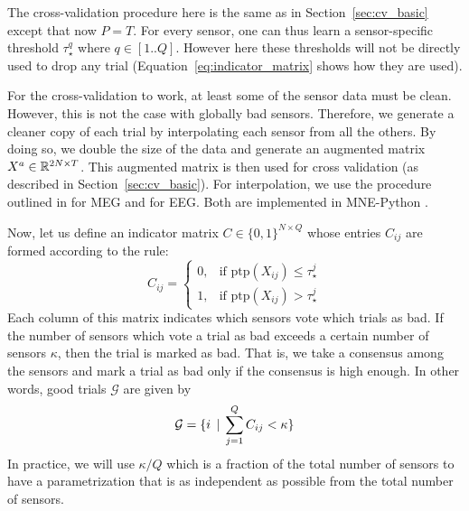 The cross-validation procedure here is the same as in Section~\ref{sec:cv_basic} except that now $P=T$. For every sensor, one can thus learn a sensor-specific threshold $\tau_{\star}^{q}$ where $q \in [1 .. Q]$. However here these thresholds will not be directly used to drop any trial (Equation~\ref{eq:indicator_matrix} shows how they are used).

For the cross-validation to work, at least some of the sensor data must be clean. However, this is not the case with globally bad sensors. 
Therefore, we generate a cleaner copy of each trial by interpolating each sensor from all the others. By doing so, we double the size of the data and generate an augmented matrix $X^{a} \in \mathbb{R}^{2N \times T}$. This augmented matrix is then used for cross validation (as described in Section~\ref{sec:cv_basic}). 
For interpolation, we use the procedure outlined in \citep{hamalainen1994interpreting} for MEG and \citep{perrin1989spherical} for EEG. Both are implemented in MNE-Python \citep{gramfort2013meg} .



Now, let us define an indicator matrix $C \in \{0, 1\}^{N \times Q}$ whose entries $C_{ij}$ are formed according to the rule:
\begin{equation} \label{eq:indicator_matrix}
C_{ij} = \begin{cases} 
0, & \text{if } \mathrm{ptp}(X_{ij}) \leq \tau^{j}_{\star} \\
1, & \text{if } \mathrm{ptp}(X_{ij}) > \tau^{j}_{\star}
\end{cases}
\end{equation}
Each column of this matrix indicates which sensors vote which trials as bad. If the number of sensors which vote a trial as bad exceeds a certain number of sensors $\kappa$, then the trial is marked as bad. That is, we take a consensus among the sensors and mark a trial as bad only if the consensus is high enough. In other words, good trials $\mathcal{G}$ are given by
\begin{equation}
\mathcal{G} = \{i \, \mid \, \sum_{j=1}^{Q} C_{ij} < \kappa \}
\end{equation}
In practice, we will use $\kappa/Q$ which is a fraction of the total number of sensors to have a parametrization that is as independent as possible from the total number of sensors.


